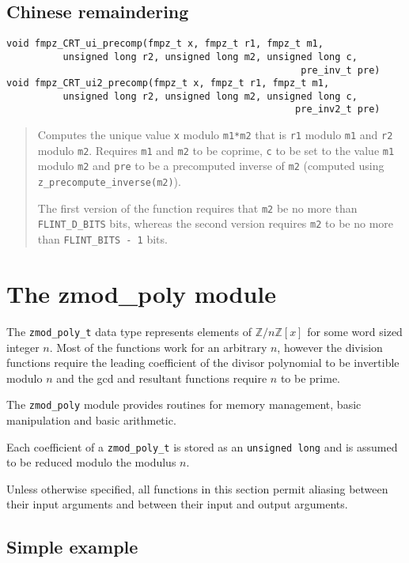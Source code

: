 \documentclass[a4paper,10pt]{article}
\newcommand{\Z}{\mathbb{Z}}
\newcommand{\code}{\lstinline}
\begin{document}
\subsection{Chinese remaindering}
\begin{lstlisting}
void fmpz_CRT_ui_precomp(fmpz_t x, fmpz_t r1, fmpz_t m1, 
          unsigned long r2, unsigned long m2, unsigned long c, 
                                                    pre_inv_t pre)
void fmpz_CRT_ui2_precomp(fmpz_t x, fmpz_t r1, fmpz_t m1, 
          unsigned long r2, unsigned long m2, unsigned long c, 
                                                   pre_inv2_t pre)
\end{lstlisting}
\begin{quote}
Computes the unique value \code{x} modulo \code{m1*m2} that is \code{r1} modulo \code{m1} and \code{r2} modulo \code{m2}. Requires \code{m1} and \code{m2} to be coprime, \code{c} to be set to the value \code{m1} modulo \code{m2} and \code{pre} to be a precomputed inverse of \code{m2} (computed using \code{z_precompute_inverse(m2)}). 

The first version of the function requires that \code{m2} be no more than \code{FLINT_D_BITS} bits, whereas the second version requires \code{m2} to be no more than \code{FLINT_BITS - 1} bits.
\end{quote}

\section{The zmod\_poly module}

The \code{zmod_poly_t} data type represents elements of $\Z/n\Z[x]$ for some word sized integer $n$. Most of the functions work for an arbitrary $n$, however the division functions require the leading coefficient of the divisor polynomial to be invertible modulo $n$ and the gcd and resultant functions require $n$ to be prime.

The \code{zmod_poly} module provides routines for memory management, basic manipulation and basic arithmetic.

Each coefficient of a \code{zmod_poly_t} is stored as an \code{unsigned long} and is assumed to be reduced modulo the modulus $n$.

Unless otherwise specified, all functions in this section permit aliasing between their input arguments and between their input and output arguments. 

\subsection{Simple example}
\end{document}
